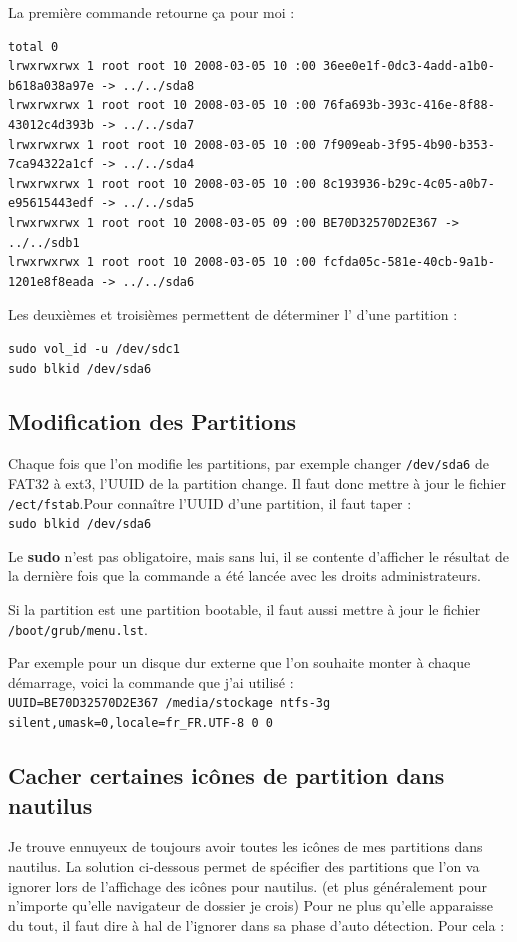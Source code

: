 \documentclass[a4paper,twoside]{article}
\begin{document}
La première commande retourne ça pour moi :

\begin{small}\begin{verbatim}
total 0
lrwxrwxrwx 1 root root 10 2008-03-05 10 :00 36ee0e1f-0dc3-4add-a1b0-b618a038a97e -> ../../sda8
lrwxrwxrwx 1 root root 10 2008-03-05 10 :00 76fa693b-393c-416e-8f88-43012c4d393b -> ../../sda7
lrwxrwxrwx 1 root root 10 2008-03-05 10 :00 7f909eab-3f95-4b90-b353-7ca94322a1cf -> ../../sda4
lrwxrwxrwx 1 root root 10 2008-03-05 10 :00 8c193936-b29c-4c05-a0b7-e95615443edf -> ../../sda5
lrwxrwxrwx 1 root root 10 2008-03-05 09 :00 BE70D32570D2E367 -> ../../sdb1
lrwxrwxrwx 1 root root 10 2008-03-05 10 :00 fcfda05c-581e-40cb-9a1b-1201e8f8eada -> ../../sda6
\end{verbatim}\end{small}

Les deuxièmes et troisièmes permettent de déterminer l' d'une partition :

\begin{verbatim}
sudo vol_id -u /dev/sdc1
sudo blkid /dev/sda6
\end{verbatim}


\subsection{Modification des Partitions}
Chaque fois que l'on modifie les partitions, par exemple changer \verb|/dev/sda6| de FAT32 à ext3, l'UUID de la partition change. Il faut donc mettre à jour le fichier \verb|/ect/fstab|.Pour connaître l'UUID d'une partition, il faut taper :\\
\verb|sudo blkid /dev/sda6|

\begin{remarque}
Le \textbf{sudo} n'est pas obligatoire, mais sans lui, il se contente d'afficher le résultat de la dernière fois que la commande a été lancée avec les droits administrateurs.
\end{remarque}

Si la partition est une partition bootable, il faut aussi mettre à jour le fichier \verb|/boot/grub/menu.lst|.

Par exemple pour un disque dur externe que l'on souhaite monter à chaque démarrage, voici la commande que j'ai utilisé :\\
\verb|UUID=BE70D32570D2E367 /media/stockage ntfs-3g silent,umask=0,locale=fr_FR.UTF-8 0 0|

\subsection{Cacher certaines icônes de partition dans nautilus}
Je trouve ennuyeux de toujours avoir toutes les icônes de mes partitions dans nautilus. La solution ci-dessous permet de spécifier des partitions que l'on va ignorer lors de l'affichage des icônes pour nautilus. (et plus généralement pour n'importe qu'elle navigateur de dossier je crois) Pour ne plus qu'elle apparaisse du tout, il faut dire à hal de l'ignorer dans sa phase d'auto détection. Pour cela :
\end{document}
